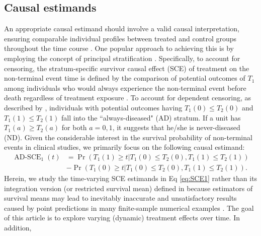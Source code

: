 \documentclass[12pt]{article}
\theoremstyle{plain}
\def\Pr{\operatorname{Pr}}
\begin{document}
\subsection{Causal estimands}
An appropriate causal estimand should involve a valid causal interpretation, ensuring comparable individual profiles between treated and control groups throughout the time course \citep{Nevo2022semicompeting}. One popular approach to achieving this is by employing the concept of principal stratification \citep{frangakis2002principal,rubin2006causal,ding2011identifiability,dai2012partially}. Specifically, to account for censoring, the stratum-specific survivor causal effect (SCE) of treatment on the non-terminal event time is defined by the comparison of potential outcomes of $T_1$ among individuals who would always experience the non-terminal event before death regardless of treatment exposure \citep{tchetgen2014identification}. To account for dependent censoring, as described by \cite{Nevo2022semicompeting}, individuals with potential outcomes having $T_1(0)\leq T_2(0)$ and $T_1(1)\leq T_2(1)$ fall into the ``always-diseased" (AD) stratum. If a unit has $T_1(a)\geq T_2(a)$ for both $a=0,1$, it suggests that he/she is never-diseased (ND). 
Given the considerable interest in the survival probability of non-terminal events in clinical studies, we primarily focus on the following causal estimand:
\begin{equation}
\begin{split}
\operatorname{AD-SCE}_1(t)
&=\Pr(T_1(1)\geq t|T_1(0)\leq T_2(0),T_1(1)\leq T_2(1))\\
&-\Pr(T_1(0)\geq t|T_1(0)\leq T_2(0),T_1(1)\leq T_2(1)).
\label{eq:SCE1}
\end{split}
\end{equation}
Herein, we study the time-varying SCE estimands in Eq \eqref{eq:SCE1} rather than its integration version (or restricted survival mean) defined in \cite{Nevo2022semicompeting} because estimators of survival means may lead to inevitably inaccurate and unsatisfactory results caused by point predictions in many finite-sample numerical examples \citep{graf1999assessment}. The goal of this article is to explore varying  (dynamic) treatment effects over time. In addition, 
\end{document}
